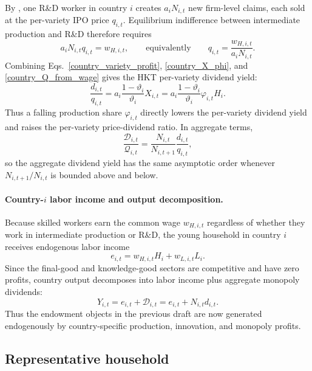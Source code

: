 \documentclass{article}
\begin{document}
By , one R\&D worker in country $i$ creates $a_iN_{i,t}$ new firm-level claims, each sold at the per-variety IPO price $q_{i,t}$. Equilibrium indifference between intermediate production and R\&D therefore requires
\begin{equation}\label{country_Q_from_wage}
a_iN_{i,t}q_{i,t}=w_{H,i,t},
\qquad
\text{equivalently}\qquad
q_{i,t}=\frac{w_{H,i,t}}{a_iN_{i,t}}.
\end{equation}
Combining Eqs.~\eqref{country_variety_profit}, \eqref{country_X_phi}, and \eqref{country_Q_from_wage} gives the HKT per-variety dividend yield:
\begin{equation}\label{country_dividend_yield}
\frac{d_{i,t}}{q_{i,t}}
=
a_i\frac{1-\vartheta_i}{\vartheta_i}X_{i,t}
=
a_i\frac{1-\vartheta_i}{\vartheta_i}\varphi_{i,t}H_i.
\end{equation}
Thus a falling production share $\varphi_{i,t}$ directly lowers the per-variety dividend yield and raises the per-variety price-dividend ratio. In aggregate terms,
\[
\frac{\mathcal D_{i,t}}{\mathcal Q_{i,t}}
=
\frac{N_{i,t}}{N_{i,t+1}}\frac{d_{i,t}}{q_{i,t}},
\]
so the aggregate dividend yield has the same asymptotic order whenever $N_{i,t+1}/N_{i,t}$ is bounded above and below.

\paragraph{Country-$i$ labor income and output decomposition.}
Because skilled workers earn the common wage $w_{H,i,t}$ regardless of whether they work in intermediate production or R\&D, the young household in country $i$ receives endogenous labor income
\begin{equation}\label{country_labor_income}
e_{i,t}=w_{H,i,t}H_i+w_{L,i,t}L_i.
\end{equation}
Since the final-good and knowledge-good sectors are competitive and have zero profits, country output decomposes into labor income plus aggregate monopoly dividends:
\begin{equation}\label{country_output_income_identity}
Y_{i,t}=e_{i,t}+\mathcal D_{i,t}=e_{i,t}+N_{i,t}d_{i,t}.
\end{equation}
Thus the endowment objects in the previous draft are now generated endogenously by country-specific production, innovation, and monopoly profits.

\subsection{Representative household}
\end{document}

